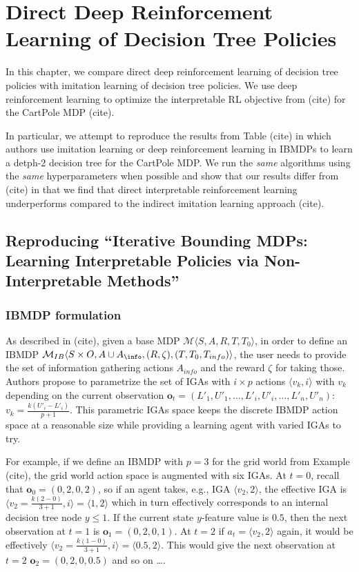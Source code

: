 \chapter{Direct Deep Reinforcement Learning of Decision Tree Policies}
In this chapter, we compare direct deep reinforcement learning of decision tree policies with imitation learning of decision tree policies.
We use deep reinforcement learning to optimize the interpretable RL objective from (cite) for the CartPole MDP (cite).

In particular, we attempt to reproduce the results from Table (cite) in which authors use imitation learning or deep reinforcement learning in IBMDPs to learn a detph-2 decision tree for the CartPole MDP.
We run the \textit{same} algorithms using the \textit{same} hyperparameters when possible and show that our results differ from (cite) in that we find that direct interpretable reinforcement learning underperforms compared to the indirect imitation learning approach (cite).

\section{Reproducing ``Iterative Bounding MDPs: Learning Interpretable Policies via Non-Interpretable Methods''}

\subsection{IBMDP formulation}
As described in (cite), given a base MDP $\mathcal{M}\langle S, A, R, T, T_0\rangle$, in order to define an IBMDP $\mathcal{M}_{IB}\langle S\times O, A\cup A_{\info}, (R, \zeta),( T, T_0, T_{info})\rangle$, the user needs to provide the set of information gathering actions $A_{info}$ and the reward $\zeta$ for taking those.
Authors propose to parametrize the set of IGAs with $i \times p$ actions $\langle v_k, i \rangle$ with $v_k$ depending on the current observation $\boldsymbol{o}_t=(L'_1, U'_1, \dots, L'_i, U'_i, \dots, L'_n, U'_n)$: $v_k = \frac{k(U'_i - L'_i)}{p+1}$.
This parametric IGAs space keeps the discrete IBMDP action space at a reasonable size while providing a learning agent with varied IGAs to try.

For example, if we define an IBMDP with $p=3$ for the grid world from Example (cite), the grid world action space is augmented with six IGAs. 
At $t=0$, recall that $\boldsymbol{o}_0=(0, 2, 0, 2)$, so if an agent takes, e.g., IGA $\langle v_2, 2 \rangle$, the effective IGA is $\langle v_2=\frac{k(2-0)}{3+1}, i \rangle = \langle 1, 2 \rangle$ which in turn effectively corresponds to an internal decision tree node $y \leq 1$.
If the current state $y$-feature value is $0.5$, then the next observation at $t=1$ is $\boldsymbol{o}_1=(0, 2, 0, 1)$. At $t=2$ if $a_t=\langle v_2, 2 \rangle$ again, it would be effectively $\langle v_2=\frac{k(1-0)}{3+1}, i \rangle = \langle 0.5, 2 \rangle$. 
This would give the next observation at $t=2$ $\boldsymbol{o}_2=(0, 2, 0, 0.5)$ and so on \dots. 

